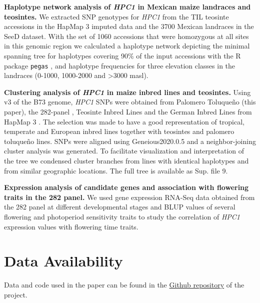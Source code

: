 \documentclass[9pt,twocolumn,twoside,lineno]{BioRxiv}
\def\code#1{\texttt{#1}}
\begin{document}
\textbf{Haplotype network analysis of \textit{HPC1} in Mexican maize landraces and teosintes.}
We extracted SNP genotypes for \textit{HPC1} from the TIL teosinte accessions in the HapMap 3 imputed data \cite{Bukowski2017-ng} and the 3700 Mexican landraces in the SeeD dataset. 
With the set of 1060 accessions that were homozygous at all sites in this genomic region we calculated a haplotype network depicting the minimal spanning tree for haplotypes covering 90\% of the input accessions with the R package \code{pegas} \cite{paradis2010}, and haplotype frequencies for three elevation classes in the landraces (0-1000, 1000-2000 and >3000 masl).

\textbf{Clustering analysis of \textit{HPC1} in maize inbred lines and teosintes.}
Using v3 of the B73 genome, \textit{HPC1} SNPs were obtained from Palomero Toluqueño (this paper), the 282-panel \cite{Flint-Garcia2005-hb}, Teosinte Inbred Lines and the German Inbred Lines from HapMap 3 \cite{Bukowski2017-ng}. 
The selection was made to have a good representation of tropical, temperate and European inbred lines together with teosintes and palomero toluqueño lines.
SNPs were aligned using Geneious2020.0.5 and a neighbor-joining cluster analysis was generated. 
To facilitate visualization and interpretation of the tree we condensed cluster branches from lines with identical haplotypes and from similar geographic locations. 
The full tree is available as Sup. file 9. 

\textbf{Expression analysis of candidate genes and association with flowering traits in the 282 panel.}
We used gene expression RNA-Seq data obtained from the 282 panel at different developmental stages \cite{Kremling2018-gn} and BLUP values of several flowering and photoperiod sensitivity traits \cite{Hung2012-ms} to study the correlation of \textit{HPC1} expression values with flowering time traits.  

\section{Data Availability}
Data and code used in the paper can be found in the \href{https://github.com/sawers-rellan-labs/genetics-phospholipids-highlands}{Github repository} of the project. 
\end{document}
